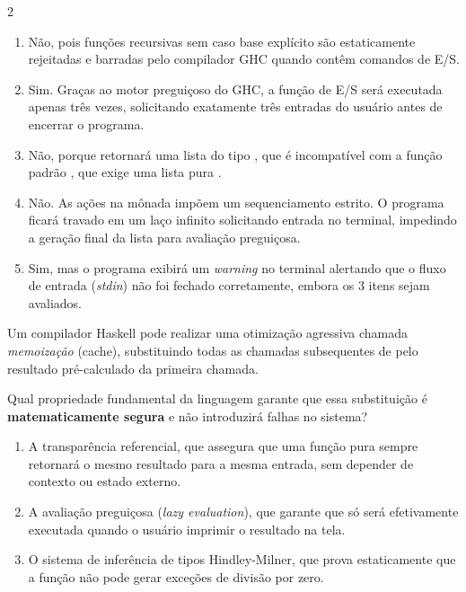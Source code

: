 \documentclass[a4paper,10pt,brazil]{article}
\begin{document}
\begin{multicols}{2}
\begin{enumerate}
  \item Não, pois funções recursivas sem caso base explícito são estaticamente rejeitadas e barradas pelo compilador GHC quando contêm comandos de E/S.

  \item Sim. Graças ao motor preguiçoso do GHC, a função de E/S será executada apenas três vezes, solicitando exatamente três entradas do usuário antes de encerrar o programa.

  \item Não, porque  retornará uma lista do tipo \haskellinline{[IO String]}, que é incompatível com a função padrão , que exige uma lista pura \haskellinline{[a]}.

  \item Não. As ações na mônada  impõem um sequenciamento estrito. O programa ficará travado em um laço infinito solicitando entrada no terminal, impedindo a geração final da lista para avaliação preguiçosa.

  \item Sim, mas o programa exibirá um \emph{warning} no terminal alertando que o fluxo de entrada (\emph{stdin}) não foi fechado corretamente, embora os 3 itens sejam avaliados.


\end{enumerate}

Um compilador Haskell pode realizar uma otimização agressiva chamada \emph{memoização} (cache), substituindo todas as chamadas subsequentes de  pelo resultado pré-calculado da primeira chamada. 

Qual propriedade fundamental da linguagem garante que essa substituição é \textbf{matematicamente segura} e não introduzirá falhas no sistema?

\begin{enumerate}
  \item A transparência referencial, que assegura que uma função pura sempre retornará o mesmo resultado para a mesma entrada, sem depender de contexto ou estado externo.

  \item A avaliação preguiçosa (\emph{lazy evaluation}), que garante que  só será efetivamente executada quando o usuário imprimir o resultado na tela.

  \item O sistema de inferência de tipos Hindley-Milner, que prova estaticamente que a função não pode gerar exceções de divisão por zero.


\end{enumerate}
\end{multicols}
\end{document}

